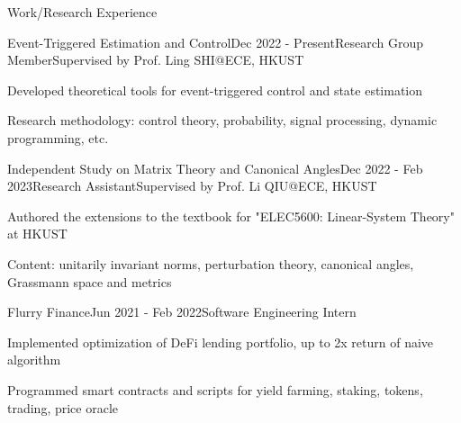 \documentclass{resume}
\begin{document}
\begin{rSection}{Work/Research Experience}
    
    \begin{rSubsection}{Event-Triggered Estimation and Control}{Dec 2022 - Present}{Research Group Member}{Supervised by Prof. Ling SHI@ECE, HKUST}
        \item Developed theoretical tools for event-triggered control and state estimation
        \item Research methodology: control theory, probability, signal processing, dynamic programming, etc.
    \end{rSubsection}

    \begin{rSubsection}{Independent Study on Matrix Theory and Canonical Angles}{Dec 2022 - Feb 2023}{Research Assistant}{Supervised by Prof. Li QIU@ECE, HKUST}
        \item Authored the extensions to the textbook for "ELEC5600: Linear-System Theory" at HKUST
        \item Content: unitarily invariant norms, perturbation theory, canonical angles, Grassmann space and metrics
    \end{rSubsection}
    
    \begin{rSubsection}{Flurry Finance}{Jun 2021 - Feb 2022}{Software Engineering Intern}{}
        \item Implemented optimization of DeFi lending portfolio, up to 2x return of naive algorithm
        \item Programmed smart contracts and scripts for yield farming, staking, tokens, trading, price oracle
    \end{rSubsection}
    
\end{rSection}
\end{document}
